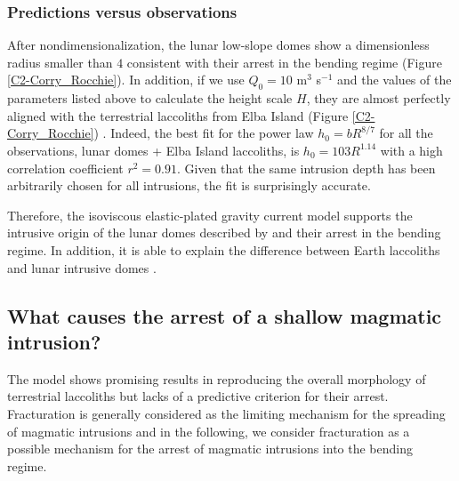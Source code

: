 \subsubsection*{Predictions versus observations}

After   nondimensionalization,   the   lunar  low-slope   domes   show
a dimensionless radius smaller than $4$ consistent with their arrest in
the bending regime (Figure \ref{C2-Corry_Rocchie}). In addition, if we
use $Q_0=10$  m$^3$ s$^{-1}$ and  the values of the  parameters listed
above to  calculate the  height scale $H$,  they are  almost perfectly
aligned  with  the  terrestrial  laccoliths from  Elba  Island  (Figure
\ref{C2-Corry_Rocchie}) \citep{Michaut:2011kg}.  Indeed,  the best fit
for the power law $h_0=bR^{8/7}$ for all the observations, lunar domes
+  Elba  Island  laccoliths,  is  $h_0  =  103R^{1.14}$  with  a  high
correlation  coefficient $r^2=0.91$.  Given  that  the same  intrusion
depth  has been  arbitrarily chosen  for  all intrusions,  the fit  is
surprisingly accurate.  

Therefore,  the   isoviscous  elastic-plated  gravity   current  model
supports  the  intrusive  origin  of  the  lunar  domes  described  by
\citet{Wohler:2009jj}  and their  arrest  in the  bending regime.   In
addition,  it  is  able  to   explain  the  difference  between  Earth
laccoliths and lunar intrusive domes \citep{Michaut:2011kg}.

\subsection{What causes the arrest of a shallow magmatic intrusion?}
\label{C2-Toughness}
The  model   shows  promising  results  in   reproducing  the  overall
morphology  of  terrestrial  laccoliths  but  lacks  of  a  predictive
criterion for  their arrest.   Fracturation is generally  considered as
the limiting mechanism for the spreading of magmatic intrusions and in
the following,  we consider fracturation  as a possible  mechanism for
the arrest of magmatic intrusions into the bending regime.

